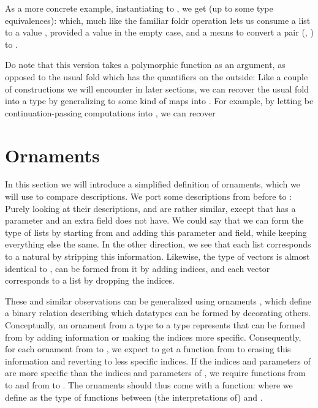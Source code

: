 As a more concrete example, instantiating  to , we get (up to some type equivalences):
which, much like the familiar foldr operation lets us consume a list to a value , provided a value  in the empty case, and a means to convert a pair (, ) to .

Do note that this version takes a polymorphic function as an argument, as opposed to the usual fold which has the quantifiers on the outside:
Like a couple of constructions we will encounter in later sections, we can recover the usual fold into a type  by generalizing  to some kind of maps into . For example, by letting  be continuation-passing computations into \bN{}, we can recover


\section{Ornaments}\label{sec:background-ornaments}
In this section we will introduce a simplified definition of ornaments, which we will use to compare descriptions. We port some descriptions from before to : 
Purely looking at their descriptions, \bN{} and  are rather similar, except that  has a parameter and an extra field \bN{} does not have. We could say that we can form the type of lists by starting from \bN{} and adding this parameter and field, while keeping everything else the same. In the other direction, we see that each list corresponds to a natural by stripping this information. Likewise, the type of vectors is almost identical to , can be formed from it by adding indices, and each vector corresponds to a list by dropping the indices.

These and similar observations can be generalized using ornaments \cite{algorn, progorn, sijsling}, which define a binary relation describing which datatypes can be formed by decorating others. Conceptually, an ornament from a type  to a type  represents that  can be formed from  by adding information or making the indices more specific. Consequently, for each ornament from  to , we expect to get a function from  to  erasing this information and reverting to less specific indices. If the indices  and parameters  of  are more specific than the indices  and parameters  of , we require functions from  to  and from  to . %
The ornaments
should thus come with a function:
where we define  as the type of functions between (the interpretations of)  and .

